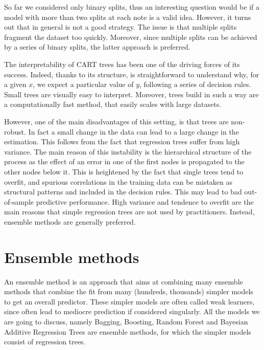 \documentclass[a4paper,11pt]{article}
\begin{document}
So far we considered only binary splits, thus an interesting question would be if a model with more than two splits at each note is a valid idea. However, it turns out that in general is not a good strategy. The issue is that multiple splits fragment the dataset too quickly. Moreover, since multiple splits can be achieved by a series of binary splits, the latter approach is preferred.

The interpretability of CART trees has been one of the driving forces of its success. Indeed, thanks to its structure, is straightforward to understand why, for a given $x$, we expect a particular value of $y$, following a series of decision rules. Small trees are visually easy to interpret. Moreover, trees build in such a way are a computationally fast method, that easily scales with large datasets.

However, one of the main disadvantages of this setting, is that trees are non-robust. In fact a small change in the data can lead to a large change in the estimation. This follows from the fact that regression trees suffer from high variance. The main reason of this instability is the hierarchical structure of the process as the effect of an error in one of the first nodes is propagated to the other nodes below it. This is heightened by the fact that single trees tend to overfit, and spurious correlations in the training data can be mistaken as structural patterns and included in the decision rules. This may lead to bad out-of-sample predictive performance. High variance and tendence to overfit are the main reasons that simple regression trees are not used by practitioners. Instead, ensemble methods are generally preferred. 

\section{Ensemble methods}

An ensemble method is an approach that aims at combining many ensemble methods that combine the fit from many (hundreds, thousands) simpler models to get an overall
 predictor. These simpler models are often called weak learners, since often lead to mediocre prediction if considered singularly.
All the models we are going to discuss, namely Bagging, Boosting, Random Forest and Bayesian Additive Regression Trees are ensemble methods, for which the simpler models consist of regression trees.
\end{document}
